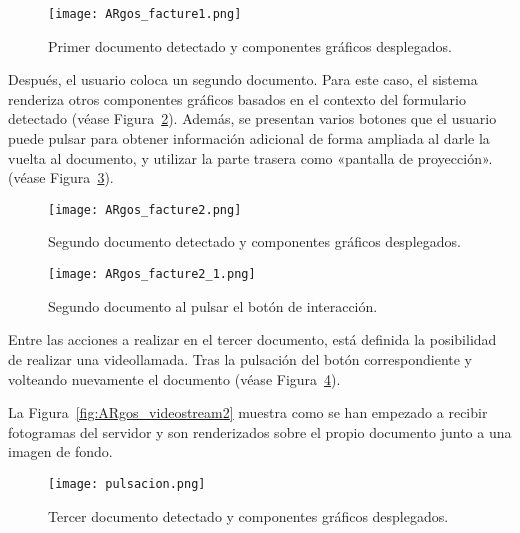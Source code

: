 \begin{figure}
  \begin{center}
    \texttt{[image: ARgos\_facture1.png]}
    \caption{Primer documento detectado y componentes gráficos desplegados.}
    \label{fig:ARgos_facture1}
  \end{center}
\end{figure}

Después, el usuario coloca un segundo documento. Para este caso, el sistema renderiza otros componentes gráficos basados en el contexto del formulario detectado (véase Figura~\ref{fig:ARgos_facture2}). Además, se presentan varios botones que el usuario puede pulsar para obtener información adicional de forma ampliada al darle la vuelta al documento, y utilizar la parte trasera como «pantalla de proyección». (véase Figura~\ref{fig:ARgos_facture2_1}).

\begin{figure}
  \begin{center}
    \texttt{[image: ARgos\_facture2.png]}
    \caption{Segundo documento detectado y componentes gráficos desplegados.}
    \label{fig:ARgos_facture2}
  \end{center}
\end{figure}

\begin{figure}
  \begin{center}
    \texttt{[image: ARgos\_facture2\_1.png]}
    \caption{Segundo documento al pulsar el botón de interacción.}
    \label{fig:ARgos_facture2_1}
  \end{center}
\end{figure}


Entre las acciones a realizar en el tercer documento, está definida la posibilidad de realizar una videollamada. Tras la pulsación del botón correspondiente y volteando nuevamente el documento (véase Figura~\ref{fig:ARgos_facture3}). 

La Figura~\ref{fig:ARgos_videostream2} muestra como se han empezado a recibir fotogramas del servidor y son renderizados sobre el propio documento junto a una imagen de fondo.

\begin{figure}
  \begin{center}
    \texttt{[image: pulsacion.png]}
    \caption{Tercer documento detectado y componentes gráficos desplegados.}
    \label{fig:ARgos_facture3}
  \end{center}
\end{figure}

